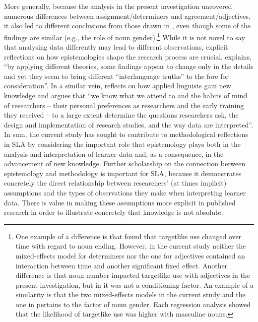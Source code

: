 \documentclass[output=paper,colorlinks,citecolor=brown,modfonts,nonflat]{../langscibook}
\begin{document}
More generally, because the analysis in the present investigation uncovered numerous differences between assignment\slash determiners and agreement\slash adjectives, it also led to different conclusions from those drawn in \citet{GudmestadEtAl2019}, even though some of the findings are similar (e.g., the role of noun gender).\footnote{{One example of a difference is that \citet{GudmestadEtAl2019} found that targetlike use changed over time with regard to noun ending. However, in the current study neither the mixed-effects model for determiners nor the one for adjectives contained an interaction between time and another significant fixed effect. Another difference is that noun number impacted targetlike use with adjectives in the present investigation, but in \citeauthor{GudmestadEtAl2019} it was not a conditioning factor. An example of a similarity is that the two mixed-effects models in the current study and the one in \citeauthor{GudmestadEtAl2019} pertains to the factor of noun gender. Each regression analysis showed that the likelihood of targetlike use was higher with masculine nouns.}} While it is not novel to say that analysing data differently may lead to different observations, explicit reflections on how epistemologies shape the research process are crucial. \citet[194]{Ortega2014trying} explains, “by applying different theories, some findings appear to change only in the details and yet they seem to bring different ``interlanguage truths'' to the fore for consideration”. In a similar vein, \citet[48]{Young2018} reflects on how applied linguists gain new knowledge and argues that “we know what we attend to and the habits of mind of researchers – their personal preferences as researchers and the early training they received – to a large extent determine the questions researchers ask, the design and implementation of research studies, and the way data are interpreted”. In sum, the current study has sought to contribute to methodological reflections in SLA by considering the important role that epistemology plays both in the analysis and interpretation of learner data and, as a consequence, in the advancement of new knowledge. Further scholarship on the connection between epistemology and methodology is important for SLA, because it demonstrates concretely the direct relationship between researchers’ (at times implicit) assumptions and the types of observations they make when interpreting learner data. There is value in making these assumptions more explicit in published research in order to illustrate concretely that knowledge is not absolute.

{\sloppy\printbibliography[heading=subbibliography,notkeyword=this]}
\end{document}
